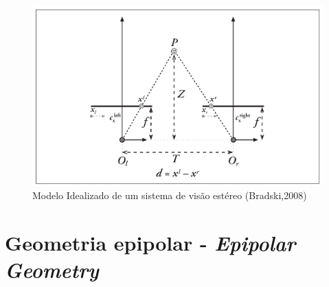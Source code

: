\begin{figure}[H]
 	\centering
 	\includegraphics[scale=0.35]{./Resources/stereo_image_geometric_model.png}
 	\caption{Modelo Idealizado de um sistema de visão estéreo (Bradski,2008)}
 	\label{stereo_image_geometric_model}
\end{figure}


\section{Geometria epipolar - \textit{Epipolar Geometry}}








